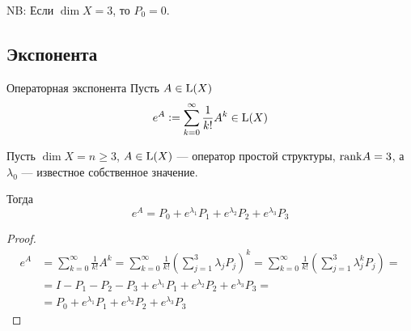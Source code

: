 NB: Если $\dim X = 3$, то $P_0 = 0$.

\subsection{Экспонента}

\begin{dfn}{Операторная экспонента}
  Пусть $A\in\mathrm{L}(X)$
  $$e^A \vcentcolon= \sum_{k=0}^\infty \frac{1}{k!} A^k \in\mathrm{L}(X)$$
\end{dfn}

\begin{thm}
  Пусть $\dim X = n \geq 3$, $A\in\mathrm{L}(X)$ --- оператор простой структуры, $\mathrm{rank} A = 3$,
  а $\lambda_0$ --- известное собственное значение.

  Тогда
  $$e^A = P_0 + e^{\lambda_1} P_1 + e^{\lambda_2} P_2 + e^{\lambda_3} P_3$$
\end{thm}
\begin{proof}
  \begin{align*}
  e^A & = \sum_{k=0}^\infty \frac{1}{k!} A^k 
    = \sum_{k=0}^\infty \frac{1}{k!} (\sum_{j=1}^3 \lambda_j P_j)^k
    = \sum_{k=0}^\infty \frac{1}{k!} (\sum_{j=1}^3 \lambda_j^k P_j) = \\
  & = I - P_1 - P_2 - P_3 + e^{\lambda_1} P_1 + e^{\lambda_2} P_2 + e^{\lambda_3} P_3 = \\
  & = P_0 +                 e^{\lambda_1} P_1 + e^{\lambda_2} P_2 + e^{\lambda_3} P_3\end{align*}
\end{proof}
